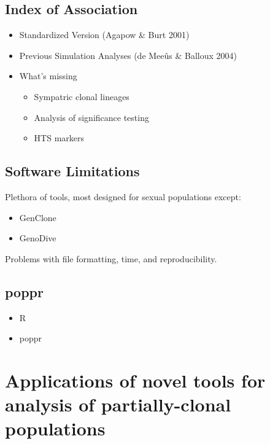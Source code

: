 \documentclass[double,12pt]{beavtex}
\providecommand{\tightlist}{%
  \setlength{\itemsep}{0pt}\setlength{\parskip}{0pt}}
\begin{document}
  \subsection{Index of Association}\label{index-of-association}
  
  \begin{itemize}
  \tightlist
  \item
    Standardized Version (Agapow \& Burt 2001)
  \item
    Previous Simulation Analyses (de Meeûs \& Balloux 2004)
  \item
    What's missing
  
    \begin{itemize}
    \tightlist
    \item
      Sympatric clonal lineages
    \item
      Analysis of significance testing
    \item
      HTS markers
    \end{itemize}
  \end{itemize}
  
  \subsection{Software Limitations}\label{software-limitations}
  
  Plethora of tools, most designed for sexual populations except:
  
  \begin{itemize}
  \tightlist
  \item
    GenClone
  \item
    GenoDive
  \end{itemize}
  
  Problems with file formatting, time, and reproducibility.
  
  \subsection{poppr}\label{poppr}
  
  \begin{itemize}
  \tightlist
  \item
    R
  \item
    poppr
  \end{itemize}
  
  \section{Applications of novel tools for analysis of partially-clonal
  populations}\label{applications-of-novel-tools-for-analysis-of-partially-clonal-populations}
  
\end{document}
